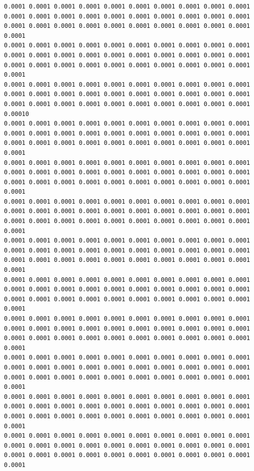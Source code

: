 \begin{lstlisting}[caption= Input file for 2D vertical slice for Dam Seepage Example , label=lst:DamSeepage]
0.0001 0.0001 0.0001 0.0001 0.0001 0.0001 0.0001 0.0001 0.0001 0.0001 0.0001 0.0001 0.0001 0.0001 0.0001 0.0001 0.0001 0.0001 0.0001 0.0001 0.0001 0.0001 0.0001 0.0001 0.0001 0.0001 0.0001 0.0001 0.0001 0.0001 0.0001
0.0001 0.0001 0.0001 0.0001 0.0001 0.0001 0.0001 0.0001 0.0001 0.0001 0.0001 0.0001 0.0001 0.0001 0.0001 0.0001 0.0001 0.0001 0.0001 0.0001 0.0001 0.0001 0.0001 0.0001 0.0001 0.0001 0.0001 0.0001 0.0001 0.0001 0.0001
0.0001 0.0001 0.0001 0.0001 0.0001 0.0001 0.0001 0.0001 0.0001 0.0001 0.0001 0.0001 0.0001 0.0001 0.0001 0.0001 0.0001 0.0001 0.0001 0.0001 0.0001 0.0001 0.0001 0.0001 0.0001 0.0001 0.0001 0.0001 0.0001 0.0001 0.00010
0.0001 0.0001 0.0001 0.0001 0.0001 0.0001 0.0001 0.0001 0.0001 0.0001 0.0001 0.0001 0.0001 0.0001 0.0001 0.0001 0.0001 0.0001 0.0001 0.0001 0.0001 0.0001 0.0001 0.0001 0.0001 0.0001 0.0001 0.0001 0.0001 0.0001 0.0001
0.0001 0.0001 0.0001 0.0001 0.0001 0.0001 0.0001 0.0001 0.0001 0.0001 0.0001 0.0001 0.0001 0.0001 0.0001 0.0001 0.0001 0.0001 0.0001 0.0001 0.0001 0.0001 0.0001 0.0001 0.0001 0.0001 0.0001 0.0001 0.0001 0.0001 0.0001
0.0001 0.0001 0.0001 0.0001 0.0001 0.0001 0.0001 0.0001 0.0001 0.0001 0.0001 0.0001 0.0001 0.0001 0.0001 0.0001 0.0001 0.0001 0.0001 0.0001 0.0001 0.0001 0.0001 0.0001 0.0001 0.0001 0.0001 0.0001 0.0001 0.0001 0.0001
0.0001 0.0001 0.0001 0.0001 0.0001 0.0001 0.0001 0.0001 0.0001 0.0001 0.0001 0.0001 0.0001 0.0001 0.0001 0.0001 0.0001 0.0001 0.0001 0.0001 0.0001 0.0001 0.0001 0.0001 0.0001 0.0001 0.0001 0.0001 0.0001 0.0001 0.0001
0.0001 0.0001 0.0001 0.0001 0.0001 0.0001 0.0001 0.0001 0.0001 0.0001 0.0001 0.0001 0.0001 0.0001 0.0001 0.0001 0.0001 0.0001 0.0001 0.0001 0.0001 0.0001 0.0001 0.0001 0.0001 0.0001 0.0001 0.0001 0.0001 0.0001 0.0001
0.0001 0.0001 0.0001 0.0001 0.0001 0.0001 0.0001 0.0001 0.0001 0.0001 0.0001 0.0001 0.0001 0.0001 0.0001 0.0001 0.0001 0.0001 0.0001 0.0001 0.0001 0.0001 0.0001 0.0001 0.0001 0.0001 0.0001 0.0001 0.0001 0.0001 0.0001
0.0001 0.0001 0.0001 0.0001 0.0001 0.0001 0.0001 0.0001 0.0001 0.0001 0.0001 0.0001 0.0001 0.0001 0.0001 0.0001 0.0001 0.0001 0.0001 0.0001 0.0001 0.0001 0.0001 0.0001 0.0001 0.0001 0.0001 0.0001 0.0001 0.0001 0.0001
0.0001 0.0001 0.0001 0.0001 0.0001 0.0001 0.0001 0.0001 0.0001 0.0001 0.0001 0.0001 0.0001 0.0001 0.0001 0.0001 0.0001 0.0001 0.0001 0.0001 0.0001 0.0001 0.0001 0.0001 0.0001 0.0001 0.0001 0.0001 0.0001 0.0001 0.0001
0.0001 0.0001 0.0001 0.0001 0.0001 0.0001 0.0001 0.0001 0.0001 0.0001 0.0001 0.0001 0.0001 0.0001 0.0001 0.0001 0.0001 0.0001 0.0001 0.0001 0.0001 0.0001 0.0001 0.0001 0.0001 0.0001 0.0001 0.0001 0.0001 0.0001 0.0001
\end{lstlisting}

